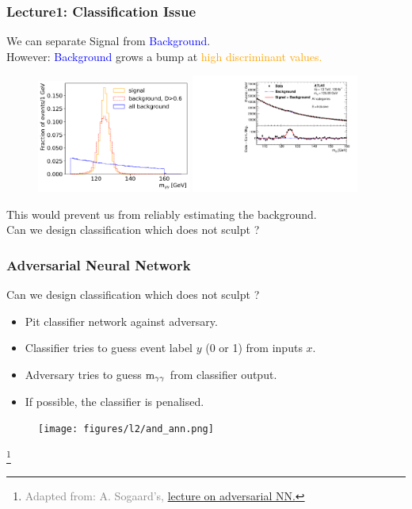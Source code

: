 \documentclass[11pt,xcolor=dvipsnames,aspectratio=169]{beamer}
\newcommand\blfootnote[1]{%
  \begingroup
  \renewcommand\thefootnote{}\footnote{\hspace{-30pt}\textcolor{Gray}{\tiny #1}}%
  \addtocounter{footnote}{-1}%
  \endgroup
}
\begin{document}
\begin{frame}
  \frametitle{\bf Lecture1: Classification Issue}
  We can separate \textcolor{EDBRed}{Signal} from \textcolor{Blue}{Background}.\\
  However: \textcolor{Blue}{Background} grows a bump at \textcolor{Orange}{high discriminant values.}
  \begin{figure}
    \includegraphics[width=0.45\textwidth]{figures/l2/lect_plots/myy_noscale.pdf}
    \includegraphics[width=0.49\textwidth]{figures/l1/challenge/figaux_01.pdf}
  \end{figure}
  This would prevent us from reliably estimating the background.\\
  Can we design classification which does not sculpt \myy{}? 
\end{frame}

\begin{frame}
  \frametitle{\bf Adversarial Neural Network}
  Can we design classification which does not sculpt \myy{}?
  \begin{itemize}
  \item Pit \textcolor{EDBBlue}{classifier} network against \textcolor{EDBRed}{adversary}.
  \item \textcolor{EDBBlue}{Classifier} tries to guess event label $y$ (0 or 1) from inputs $x$.
  \item \textcolor{EDBRed}{Adversary} tries to guess $\mathrm{m}_{\gamma\gamma}$ from classifier output.
  \item If possible, the \textcolor{EDBBlue}{classifier} is penalised.
  \end{itemize}
  \begin{figure}
    \texttt{[image: figures/l2/and\_ann.png]}
  \end{figure}
  \blfootnote{Adapted from: A. Sogaard's,
    \href{https://github.com/asogaard/ep2mlf/blob/master/01-adversarial/2018-11-13_EP2MLF_AndreasSogaard.pdf}{lecture
    on adversarial NN.}}
\end{frame}
\end{document}
